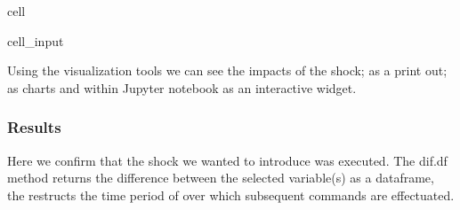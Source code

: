 \documentclass[letterpaper,10pt,english]{jupyterBook}
\begin{document}
\begin{sphinxuseclass}{cell}\begin{sphinxVerbatimInput}

\begin{sphinxuseclass}{cell_input}
\begin{sphinxVerbatim}[commandchars=\\\{\}]
   
\end{sphinxVerbatim}

\end{sphinxuseclass}\end{sphinxVerbatimInput}

\end{sphinxuseclass}
\sphinxAtStartPar
Using the  visualization tools we can see the impacts of the shock; as a print out; as charts and within Jupyter notebook as an interactive widget.


\subsubsection{Results}
\label{\detokenize{content/06_WBModels/LoadingWBModel:results}}
\sphinxAtStartPar
Here we confirm that the shock we wanted to introduce was executed. The dif.df method returns the difference between the selected variable(s) as a dataframe, the  restructs the time period of over which subsequent commands are effectuated.
\end{document}
